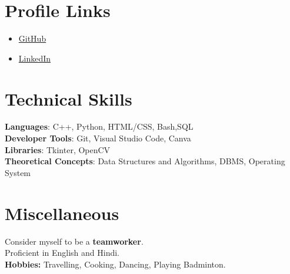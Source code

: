 \documentclass[a4paper,20pt]{article}
\newcommand{\resumeItem}[1]{
  \item\small{
    {#1 \vspace{-2pt}}
  }
}
\newcommand{\resumeItemListStart}{\begin{itemize}}
\newcommand{\resumeItemListEnd}{\end{itemize}\vspace{-5pt}}
\begin{document}
\section{Profile Links}
 \begin{itemize}[leftmargin=0.15in, label={}]
    \resumeItemListStart
        \resumeItem {\href{https://github.com/anushraya}{GitHub}}
        
        \resumeItem {\href{https://www.linkedin.com/in/anushraya-sharma-9a967a204}{LinkedIn}}
      \resumeItemListEnd
 \end{itemize}
 \vspace{-16pt}

%
\section{Technical Skills}
 \begin{itemize}[leftmargin=0.15in, label={}]
    \small{\item{
     \textbf{Languages}{: C++, Python, HTML/CSS, Bash,SQL} \\
     \textbf{Developer Tools}{: Git, Visual Studio Code, Canva} \\
     \textbf{Libraries}{: Tkinter, OpenCV} \\
     \textbf{Theoretical Concepts}{: Data Structures and Algorithms, DBMS, Operating System} \\
    }}
 \end{itemize}
 \vspace{-16pt}

%
\section{Miscellaneous}
 \begin{itemize}[leftmargin=0.15in, label={}]
    \small{\item{
     {Consider myself to be a \textbf{teamworker}.} \\
     {Proficient in English and Hindi.} \\
     {\textbf{Hobbies:}  Travelling, Cooking, Dancing, Playing Badminton.} \\
    }}
 \end{itemize}
 \vspace{-16pt}
\end{document}
